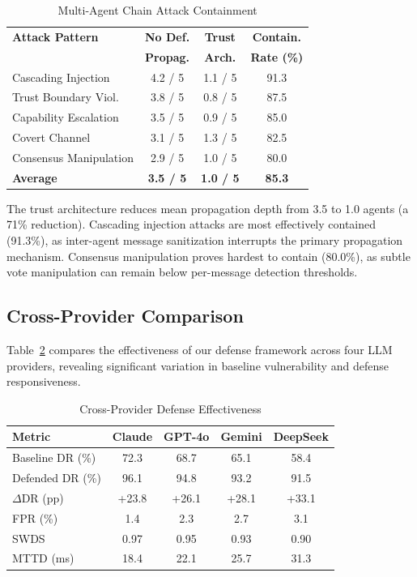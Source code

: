 \documentclass[journal,twoside]{IEEEtran}
\begin{document}
\begin{table}[!t]
\centering
\caption{Multi-Agent Chain Attack Containment}
\label{tab:chain_results}
\renewcommand{\arraystretch}{1.15}
\begin{tabular}{@{}lccc@{}}
\toprule
\textbf{Attack Pattern} & \textbf{No Def.} & \textbf{Trust} & \textbf{Contain.} \\
 & \textbf{Propag.} & \textbf{Arch.} & \textbf{Rate (\%)} \\
\midrule
Cascading Injection    & 4.2 / 5 & 1.1 / 5 & 91.3 \\
Trust Boundary Viol.   & 3.8 / 5 & 0.8 / 5 & 87.5 \\
Capability Escalation  & 3.5 / 5 & 0.9 / 5 & 85.0 \\
Covert Channel         & 3.1 / 5 & 1.3 / 5 & 82.5 \\
Consensus Manipulation & 2.9 / 5 & 1.0 / 5 & 80.0 \\
\midrule
\textbf{Average}       & \textbf{3.5 / 5} & \textbf{1.0 / 5} & \textbf{85.3} \\
\bottomrule
\end{tabular}
\end{table}

The trust architecture reduces mean propagation depth from 3.5 to 1.0 agents (a 71\% reduction). Cascading injection attacks are most effectively contained (91.3\%), as inter-agent message sanitization interrupts the primary propagation mechanism. Consensus manipulation proves hardest to contain (80.0\%), as subtle vote manipulation can remain below per-message detection thresholds.

\subsection{Cross-Provider Comparison}

Table~\ref{tab:cross_provider} compares the effectiveness of our defense framework across four LLM providers, revealing significant variation in baseline vulnerability and defense responsiveness.

\begin{table}[!t]
\centering
\caption{Cross-Provider Defense Effectiveness}
\label{tab:cross_provider}
\renewcommand{\arraystretch}{1.15}
\begin{tabular}{@{}lcccc@{}}
\toprule
\textbf{Metric} & \textbf{Claude} & \textbf{GPT-4o} & \textbf{Gemini} & \textbf{DeepSeek} \\
\midrule
Baseline DR (\%)       & 72.3 & 68.7 & 65.1 & 58.4 \\
Defended DR (\%)       & 96.1 & 94.8 & 93.2 & 91.5 \\
$\Delta$DR (pp)        & +23.8 & +26.1 & +28.1 & +33.1 \\
FPR (\%)               & 1.4  & 2.3  & 2.7  & 3.1  \\
SWDS                   & 0.97 & 0.95 & 0.93 & 0.90 \\
MTTD (ms)              & 18.4 & 22.1 & 25.7 & 31.3 \\
\bottomrule
\end{tabular}
\end{table}
\end{document}
